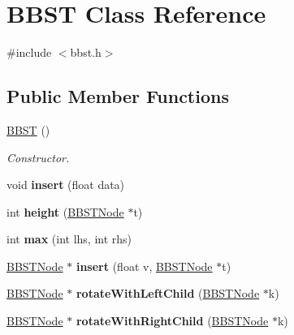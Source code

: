 \hypertarget{class_b_b_s_t}{}\section{B\+B\+S\+T Class Reference}
\label{class_b_b_s_t}


{\ttfamily \#include $<$bbst.\+h$>$}

\subsection*{Public Member Functions}
\begin{DoxyCompactItemize}
\item 
\hyperlink{class_b_b_s_t_a42c0115cc64b72a9cd2c18dbd1eed28f}{B\+B\+S\+T} ()
\begin{DoxyCompactList}\small\item\em Constructor. \end{DoxyCompactList}\item 
\hypertarget{class_b_b_s_t_a09dda17b58f815d0ffe977685dba0e57}{}void {\bfseries insert} (float data)\label{class_b_b_s_t_a09dda17b58f815d0ffe977685dba0e57}

\item 
\hypertarget{class_b_b_s_t_abd97ed045f7e46ec7957074a7969e400}{}int {\bfseries height} (\hyperlink{class_b_b_s_t_node}{B\+B\+S\+T\+Node} $\ast$t)\label{class_b_b_s_t_abd97ed045f7e46ec7957074a7969e400}

\item 
\hypertarget{class_b_b_s_t_a6bd0d3129956a139a07f3e70a76e0b29}{}int {\bfseries max} (int lhs, int rhs)\label{class_b_b_s_t_a6bd0d3129956a139a07f3e70a76e0b29}

\item 
\hypertarget{class_b_b_s_t_ae755ee5fc12990a06e20811027747d21}{}\hyperlink{class_b_b_s_t_node}{B\+B\+S\+T\+Node} $\ast$ {\bfseries insert} (float v, \hyperlink{class_b_b_s_t_node}{B\+B\+S\+T\+Node} $\ast$t)\label{class_b_b_s_t_ae755ee5fc12990a06e20811027747d21}

\item 
\hypertarget{class_b_b_s_t_a23e916d06c6abf8cd99ec8304bef3461}{}\hyperlink{class_b_b_s_t_node}{B\+B\+S\+T\+Node} $\ast$ {\bfseries rotate\+With\+Left\+Child} (\hyperlink{class_b_b_s_t_node}{B\+B\+S\+T\+Node} $\ast$k)\label{class_b_b_s_t_a23e916d06c6abf8cd99ec8304bef3461}

\item 
\hypertarget{class_b_b_s_t_a27a9a1ccc67325989f1860afc65b390e}{}\hyperlink{class_b_b_s_t_node}{B\+B\+S\+T\+Node} $\ast$ {\bfseries rotate\+With\+Right\+Child} (\hyperlink{class_b_b_s_t_node}{B\+B\+S\+T\+Node} $\ast$k)\label{class_b_b_s_t_a27a9a1ccc67325989f1860afc65b390e}


\end{DoxyCompactItemize}
